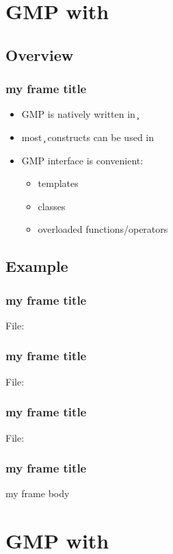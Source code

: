 \section{GMP with \cpp}

\subsection{Overview}

\begin{frame}
\frametitle{my frame title}
\begin{itemize}
\item GMP is natively written in \c
\item most \c{} constructs can be used in \cpp
\item GMP \cpp{} interface is convenient:
  \begin{itemize}
  \item templates
  \item classes
  \item overloaded functions/operators
  \end{itemize}
\end{itemize}
\end{frame}

\subsection{Example}

\begin{frame}
\frametitle{my frame title}
File: 
\codes{}
\end{frame}

\begin{frame}
\frametitle{my frame title}
File: 
\codes{}
\end{frame}

\begin{frame}
\frametitle{my frame title}
File: 
\codes{}
\end{frame}

\begin{frame}
\frametitle{my frame title}
my frame body
\end{frame}


\section{GMP with \make}

